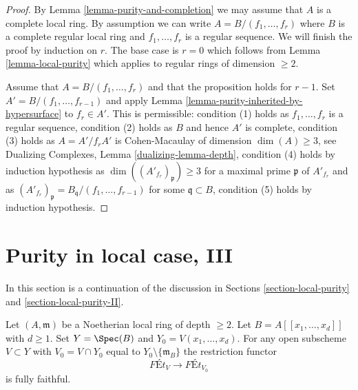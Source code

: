 \begin{proof}
By Lemma \ref{lemma-purity-and-completion} we may assume that $A$ is
a complete local ring. By assumption we can write
$A = B/(f_1, \ldots, f_r)$ where $B$ is a complete regular local
ring and $f_1, \ldots, f_r$ is a regular sequence.
We will finish the proof by induction on $r$.
The base case is $r = 0$ which follows from
Lemma \ref{lemma-local-purity} which applies to
regular rings of dimension $\geq 2$.

\medskip\noindent
Assume that $A = B/(f_1, \ldots, f_r)$ and that the proposition
holds for $r - 1$. Set $A' = B/(f_1, \ldots, f_{r - 1})$ and apply
Lemma \ref{lemma-purity-inherited-by-hypersurface} to $f_r \in A'$.
This is permissible:
condition (1) holds as $f_1, \ldots, f_r$ is a regular sequence,
condition (2) holds as $B$ and hence $A'$ is complete,
condition (3) holds as $A = A'/f_r A'$ is Cohen-Macaulay of dimension
$\dim(A) \geq 3$, see Dualizing Complexes, Lemma \ref{dualizing-lemma-depth},
condition (4) holds by induction hypothesis as
$\dim((A'_{f_r})_\mathfrak p) \geq 3$ for a maximal
prime $\mathfrak p$ of $A'_{f_r}$ and as
$(A'_{f_r})_\mathfrak p = B_\mathfrak q/(f_1, \ldots, f_{r - 1})$
for some $\mathfrak q \subset B$,
condition (5) holds by induction hypothesis.
\end{proof}




\section{Purity in local case, III}
\label{section-local-purity-III}

\noindent
In this section is a continuation of the discussion in
Sections \ref{section-local-purity} and \ref{section-local-purity-II}.

\begin{lemma}
\label{lemma-fully-faithful-power-series-over-depth2}
Let $(A, \mathfrak m)$ be a Noetherian local ring of depth $\geq 2$.
Let $B = A[[x_1, \ldots, x_d]]$ with $d \geq 1$.
Set $Y = \Spec(B)$ and $Y_0 = V(x_1, \ldots, x_d)$.
For any open subscheme $V \subset Y$ with
$V_0 = V \cap Y_0$ equal to $Y_0 \setminus \{\mathfrak m_B\}$
the restriction functor
$$
\textit{F\'Et}_V \longrightarrow \textit{F\'Et}_{V_0}
$$
is fully faithful.
\end{lemma}

